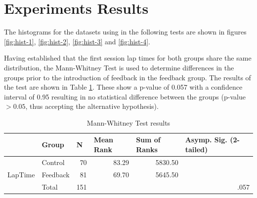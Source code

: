 \section{Experiments Results}
\label{sec:eval-ExperimentsResults}
The histograms for the datasets using in the following tests are shown in figures \ref{fig:hist-1}, \ref{fig:hist-2}, \ref{fig:hist-3} and \ref{fig:hist-4}.

Having established that the first session lap times for both groups share the same distribution, the Mann-Whitney Test is used to determine differences in the groups prior to the introduction of feedback in the feedback group. The results of the test are shown in Table \ref{table:Mann-Whitney}. These show a p-value of 0.057 with a confidence interval of 0.95 resulting in no statistical difference between the groups (p-value $> 0.05$, thus accepting the alternative hypothesis). 


\begin{table}[!htb]
	\centering
	\begin{tabular}{|ll|r|rr|r|}
		\hline
		& Group    & \multicolumn{1}{l|}{N} & \multicolumn{1}{l|}{Mean Rank} & \multicolumn{1}{l|}{Sum of Ranks} & \multicolumn{1}{l|}{Asymp. Sig. (2-tailed)} \\ \hline
		\multicolumn{1}{|l|}{\multirow{3}{*}{LapTime}} & Control  & 70                     & \multicolumn{1}{r|}{83.29}     & 5830.50                           &                                             \\ \cline{2-5}
		\multicolumn{1}{|l|}{}                         & Feedback & 81                     & \multicolumn{1}{r|}{69.70}     & 5645.50                           &                                             \\ \cline{2-5}
		\multicolumn{1}{|l|}{}                         & Total    & 151                    &                                &                                   & .057                                        \\ \hline
	\end{tabular}
	\caption[Mann-Whitney Test results]{Mann-Whitney Test results}
	\label{table:Mann-Whitney}
\end{table}

